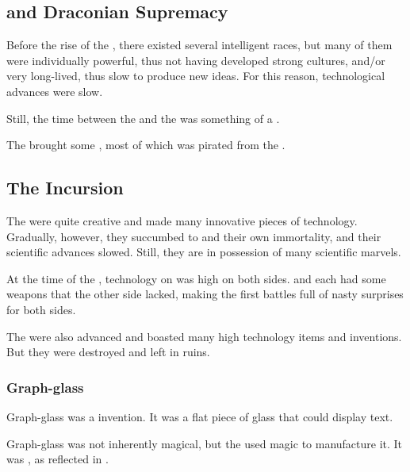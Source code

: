 \subsection{\Saphyrae and Draconian Supremacy}
Before the rise of the \resphain, there existed several intelligent races, but many of them were individually powerful, thus not having developed strong cultures, and/or very long-lived, thus slow to produce new ideas. For this reason, technological advances were slow. 

Still, the time between the \firstbanewar{} and the \secondbanewar{} was something of a . 

The \banes{} brought some , most of which was pirated from the \voyagers{}.









\subsection{The Incursion}
The \resphain{} were quite creative and made many innovative pieces of technology. Gradually, however, they succumbed to  and their own immortality, and their scientific advances slowed. Still, they are in possession of many scientific marvels. 

At the time of the \secondbanewar, technology on \Miith was high on both sides. 
\Miithians and \resphain each had some weapons that the other side lacked, making the first battles full of nasty surprises for both sides. 

The  were also advanced and boasted many high technology items and inventions. 
But they were destroyed and left in ruins. 





\subsubsection{Graph-glass}
Graph-glass was a \resphan{} invention. 
It was a flat piece of glass that could display text. 

Graph-glass was not inherently magical, but the \resphain used magic to manufacture it.
It was , as \Teshrial reflected in \TwilightAngelRememberEmph.





